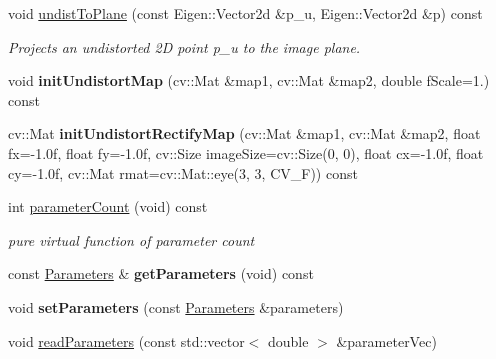 \begin{DoxyCompactItemize}
void \hyperlink{classcamodocal_1_1OCAMCamera_a804d705efdb76aa606f8cf4feddb2d7a}{undist\+To\+Plane} (const Eigen\+::\+Vector2d \&p\+\_\+u, Eigen\+::\+Vector2d \&p) const
\begin{DoxyCompactList}\small\item\em Projects an undistorted 2D point p\+\_\+u to the image plane. \end{DoxyCompactList}\item 
\mbox{\label{classcamodocal_1_1OCAMCamera_a9aa50e125c37adb6f113e187ad03935e}} 
void {\bfseries init\+Undistort\+Map} (cv\+::\+Mat \&map1, cv\+::\+Mat \&map2, double f\+Scale=1.) const
\item 
\mbox{\label{classcamodocal_1_1OCAMCamera_a0f18c5bc38cdba61df38a225110ea80a}} 
cv\+::\+Mat {\bfseries init\+Undistort\+Rectify\+Map} (cv\+::\+Mat \&map1, cv\+::\+Mat \&map2, float fx=-\/1.\+0f, float fy=-\/1.\+0f, cv\+::\+Size image\+Size=cv\+::\+Size(0, 0), float cx=-\/1.\+0f, float cy=-\/1.\+0f, cv\+::\+Mat rmat=cv\+::\+Mat\+::eye(3, 3, C\+V\+\_\+F)) const
\item 
\mbox{\label{classcamodocal_1_1OCAMCamera_ababf27122ba206613ed37f1b2ee35c4c}} 
int \hyperlink{classcamodocal_1_1OCAMCamera_ababf27122ba206613ed37f1b2ee35c4c}{parameter\+Count} (void) const
\begin{DoxyCompactList}\small\item\em pure virtual function of parameter count \end{DoxyCompactList}\item 
\mbox{\label{classcamodocal_1_1OCAMCamera_a6e065e637df28d72b5cc68d4e4df8b64}} 
const \hyperlink{classcamodocal_1_1OCAMCamera_1_1Parameters}{Parameters} \& {\bfseries get\+Parameters} (void) const
\item 
\mbox{\label{classcamodocal_1_1OCAMCamera_a5eddfcd2e89aabeaf2328a0fd95dd3ab}} 
void {\bfseries set\+Parameters} (const \hyperlink{classcamodocal_1_1OCAMCamera_1_1Parameters}{Parameters} \&parameters)
\item 
\mbox{\label{classcamodocal_1_1OCAMCamera_afc3827b25996ec448dc64bd4cbbea546}} 
void \hyperlink{classcamodocal_1_1OCAMCamera_afc3827b25996ec448dc64bd4cbbea546}{read\+Parameters} (const std\+::vector$<$ double $>$ \&parameter\+Vec)

\end{DoxyCompactItemize}
